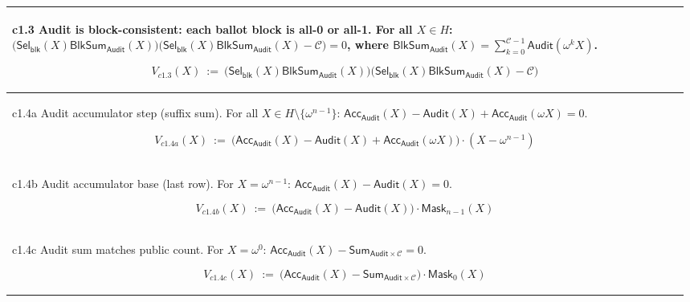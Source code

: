 \begin{table}[t]
\begin{tabular}{@{}p{0.98\linewidth}@{}}
c1.3 Audit is block-consistent: each ballot block is all-0 or all-1. For all $X\in H$:
$\bigl(\mathsf{Sel}_{\mathsf{blk}}(X)\mathsf{BlkSum}_{\mathsf{Audit}}(X)\bigr)\bigl(\mathsf{Sel}_{\mathsf{blk}}(X)\mathsf{BlkSum}_{\mathsf{Audit}}(X)-\mathcal{C}\bigr)=0$,
where $\mathsf{BlkSum}_{\mathsf{Audit}}(X)=\sum_{k=0}^{\mathcal{C}-1}\mathsf{Audit}(\omega^k X)$.
\begin{mdframed}[linewidth=0.6pt,backgroundcolor=verylightpink,innerleftmargin=6pt,innerrightmargin=6pt,innertopmargin=4pt,innerbottommargin=4pt]
\[
V_{c1.3}(X)\ :=\ \bigl(\mathsf{Sel}_{\mathsf{blk}}(X)\mathsf{BlkSum}_{\mathsf{Audit}}(X)\bigr)\bigl(\mathsf{Sel}_{\mathsf{blk}}(X)\mathsf{BlkSum}_{\mathsf{Audit}}(X)-\mathcal{C}\bigr)
\]
\end{mdframed}
\\[-2mm]
\midrule

c1.4a Audit accumulator step (suffix sum). For all $X\in H\setminus\{\omega^{n-1}\}$:
$\mathsf{Acc}_{\mathsf{Audit}}(X)-\mathsf{Audit}(X)+\mathsf{Acc}_{\mathsf{Audit}}(\omega X)=0$.
\begin{mdframed}[linewidth=0.6pt,backgroundcolor=verylightpink,innerleftmargin=6pt,innerrightmargin=6pt,innertopmargin=4pt,innerbottommargin=4pt]
\[
V_{c1.4a}(X)\ :=\ \bigl(\mathsf{Acc}_{\mathsf{Audit}}(X)-\mathsf{Audit}(X)+\mathsf{Acc}_{\mathsf{Audit}}(\omega X)\bigr)\cdot(X-\omega^{n-1})
\]
\end{mdframed}
\\[-2mm]
\midrule

c1.4b Audit accumulator base (last row). For $X=\omega^{n-1}$:
$\mathsf{Acc}_{\mathsf{Audit}}(X)-\mathsf{Audit}(X)=0$.
\begin{mdframed}[linewidth=0.6pt,backgroundcolor=verylightpink,innerleftmargin=6pt,innerrightmargin=6pt,innertopmargin=4pt,innerbottommargin=4pt]
\[
V_{c1.4b}(X)\ :=\ \bigl(\mathsf{Acc}_{\mathsf{Audit}}(X)-\mathsf{Audit}(X)\bigr)\cdot \mathsf{Mask}_{n-1}(X)
\]
\end{mdframed}
\\[-2mm]
\midrule

c1.4c Audit sum matches public count. For $X=\omega^0$:
$\mathsf{Acc}_{\mathsf{Audit}}(X)-\mathsf{Sum}_{\mathsf{Audit}\times\mathcal{C}}=0$.
\begin{mdframed}[linewidth=0.6pt,backgroundcolor=verylightpink,innerleftmargin=6pt,innerrightmargin=6pt,innertopmargin=4pt,innerbottommargin=4pt]
\[
V_{c1.4c}(X)\ :=\ \bigl(\mathsf{Acc}_{\mathsf{Audit}}(X)-\mathsf{Sum}_{\mathsf{Audit}\times\mathcal{C}}\bigr)\cdot \mathsf{Mask}_{0}(X)
\]
\end{mdframed}
\\[-2mm]

\bottomrule
\end{tabular}
\end{table}

